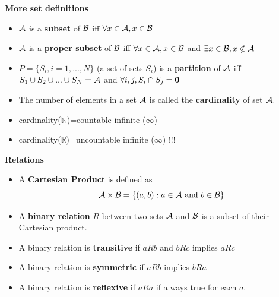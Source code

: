 \documentclass[justified, sixbynine]{tufte-book}
\def\subsubsection#1{{\bf #1}}
\theoremstyle{plain}%
\newtheorem * {corollary}{Corollary}
\theoremstyle{definition}
\theoremstyle{remark}
\newtheorem * {remark}{Remark}
\newtheorem * {note}{Note}
\begin{document}
\begin{fullwidth}
\subsubsection{More set definitions}

\begin{itemize}
\item  ${\cal A}$ is a {\bf subset} of ${\cal B}$ iff $\forall x\in {\cal A}%
, x\in {\cal B}$

\item  ${\cal A}$ is a {\bf proper subset} of ${\cal B}$ iff $\forall x\in
{\cal A}, x\in {\cal B}$ and $\exists x\in {\cal B}, x\notin {\cal A}$

\item  $P=\{S_i, i=1, ..., N\}$ (a set of sets $S_i$) is a {\bf partition} of $%
{\cal A}$ iff $S_1\cup S_2\cup ...\cup S_N={\cal A}$ and $\forall
i, j, S_i\cap S_j={\bf 0}$

\item  The number of elements in a set ${\cal A}$ is called the {\bf %
cardinality} of set ${\cal A}.$

\item  cardinality($\mathbb{N}$)=countable infinite ($\infty $)

\item  cardinality($\mathbb{R}$)=uncountable infinite ($\infty $) !!!
\end{itemize}

\subsubsection{Relations}

\begin{itemize}
\item  A {\bf Cartesian Product} is defined as
\begin{equation}
{\cal A}\times {\cal B}=\{(a, b):a\in {\cal A}\text{ and }b\in {\cal B}\}
\end{equation}

\item  A {\bf binary relation} $R$ between two sets ${\cal A}$ and ${\cal B}$
is a subset of their Cartesian product.

\item  A binary relation is {\bf transitive} if $aRb$ and $bRc$ implies $aRc$

\item  A binary relation is {\bf symmetric} if $aRb$ implies $bRa$

\item  A binary relation is {\bf reflexive} if $aRa$ if always true for each
$a.$
\end{itemize}


\end{fullwidth}
\end{document}
